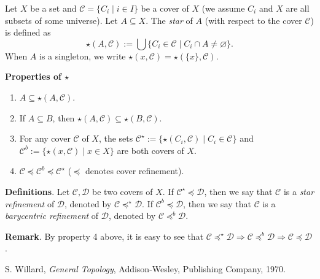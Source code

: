 \documentclass[12pt]{article}
\begin{document}
Let $X$ be a set and $\mathscr{C}=\lbrace C_i\mid i\in I\rbrace$ be a cover of $X$ (we assume $C_i$ and $X$ are all subsets of some universe).  Let $A\subseteq X$.  The \emph{star} of $A$ (with respect to the cover $\mathscr{C}$) is defined as
$$\star(A,\mathscr{C}):=\bigcup \lbrace C_i\in \mathscr{C} \mid C_i\cap A\neq \varnothing \rbrace.$$
When $A$ is a singleton, we write $\star(x,\mathscr{C})=\star(\lbrace x\rbrace, \mathscr{C})$.  

\textbf{Properties of $\star$}
\begin{enumerate}
\item $A\subseteq \star(A,\mathscr{C})$.
\item If $A\subseteq B$, then $\star(A,\mathscr{C})\subseteq \star(B,\mathscr{C})$.
\item For any cover $\mathscr{C}$ of $X$, the sets $\mathscr{C}^{\star}:=\lbrace \star(C_i,\mathscr{C}) \mid C_i\in \mathscr{C}\rbrace$ and $\mathscr{C}^b:=\lbrace \star(x,\mathscr{C})\mid x\in X\rbrace$ are both covers of $X$.
\item $\mathscr{C}\preceq \mathscr{C}^b \preceq \mathscr{C}^{\star}$ ($\preceq$ denotes cover refinement).
\end{enumerate}

\textbf{Definitions}.  Let $\mathscr{C},\mathscr{D}$ be two covers of $X$.  If $\mathscr{C}^{\star} \preceq \mathscr{D}$, then we say that $\mathscr{C}$ is a \emph{star refinement} of $\mathscr{D}$, denoted by $\mathscr{C} \preceq^{\star} \mathscr{D}$.  If $\mathscr{C}^b \preceq \mathscr{D}$, then we say that $\mathscr{C}$ is a \emph{barycentric refinement} of $\mathscr{D}$, denoted by $\mathscr{C} \preceq^b \mathscr{D}$.

\textbf{Remark}.  By property 4 above, it is easy to see that 
$\mathscr{C} \preceq^{\star}\mathscr{D}\Rightarrow \mathscr{C} \preceq^b\mathscr{D}\Rightarrow \mathscr{C} \preceq \mathscr{D}$.

\begin{thebibliography}{9}
 S. Willard, \emph{General Topology},
Addison-Wesley, Publishing Company, 1970.
\end{thebibliography}
\end{document}
